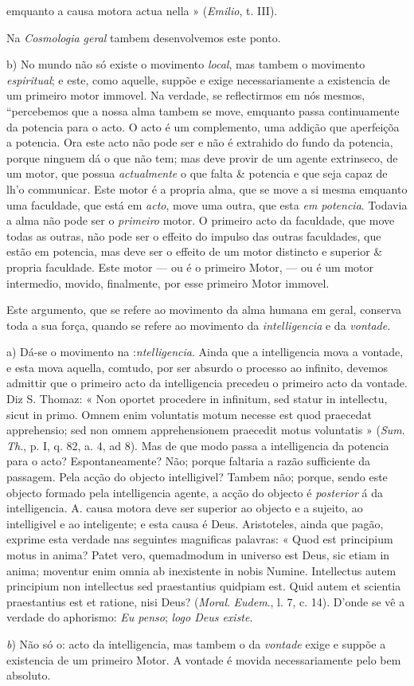emquanto a causa motora actua nella » (\emph{Emilio}, t. III).\par Na \emph{Cosmologia geral} tambem desenvolvemos este ponto.\par b) No mundo não só existe o movimento \emph{local}, mas tambem o movimento \emph{espiritual}; e este, como aquelle, suppõe e exige necessariamente a existencia de um primeiro motor immovel. Na verdade, se reflectirmos em nós mesmos, “percebemos que a nossa alma tambem se move, emquanto passa continuamente da potencia para o acto. O acto é um complemento, uma addição que aperfeiçõa a potencia. Ora este acto não pode ser e não é extrahido do fundo da potencia, porque ninguem dá o que não tem; mas deve provir de um agente extrinseco, de um motor, que possua \emph{actualmente} o que falta \& potencia e que seja capaz de lh'o communicar. Este motor é a propria alma, que se move a si mesma emquanto uma faculdade, que está em \emph{acto}, move uma outra, que esta \emph{em potencia}. Todavia a alma não pode ser o \emph{primeiro} motor. O primeiro acto da faculdade, que move todas as outras, não pode ser o effeito do impulso das outras faculdades, que estão em potencia, mas deve ser o effeito de um motor distincto e superior \& propria faculdade. Este motor --- ou é o primeiro Motor, --- ou é um motor intermedio, movido, finalmente, por esse primeiro Motor immovel.\par Este argumento, que se refere ao movimento da alma humana em geral, conserva toda a sua força, quando se refere ao movimento da \emph{intelligencia} e da \emph{vontade}.\par a) Dá-se o movimento na :\emph{ntelligencia}. Ainda que a intelligencia mova a vontade, e esta mova aquella, comtudo, por ser absurdo o processo ao infinito, devemos admittir que o primeiro acto da intelligencia precedeu o primeiro acto da vontade. Diz S. Thomaz: « Non oportet procedere in infinitum, sed statur in intellectu, sicut in primo. Omnem enim voluntatis motum necesse est quod praecedat apprehensio; sed non omnem apprehensionem praecedit motus voluntatis » (\emph{Sum}. \emph{Th}., p. I, q. 82, a. 4, ad 8). Mas de que modo passa a intelligencia da potencia para o acto? Espontaneamente? Não; porque faltaria a razão sufficiente da passagem. Pela acção do objecto intelligivel? Tambem não; porque, sendo este objecto formado pela intelligencia agente, a acção do objecto é \emph{posterior} á da intelligencia. A. causa motora deve ser superior ao objecto e a sujeito, ao intelligivel e ao inteligente; e esta causa é Deus. Aristoteles, ainda que pagão, exprime esta verdade nas seguintes magnificas palavras: « Quod est principium motus in anima? Patet vero, quemadmodum in universo est Deus, sic etiam in anima; moventur enim omnia ab inexistente in nobis Numine. Intellectus autem principium non intellectus sed praestantius quidpiam est. Quid autem et scientia praestantius est et ratione, nisi Deus? (\emph{Moral}. \emph{Eudem}., l. 7, c. 14). D'onde se vê a verdade do aphorismo: \emph{Eu penso}; \emph{logo Deus existe}.\par \emph{b}) Não só o: acto da intelligencia, mas tambem o da \emph{vontade} exige e suppõe a existencia de um primeiro Motor. A vontade é movida necessariamente pelo bem absoluto. 